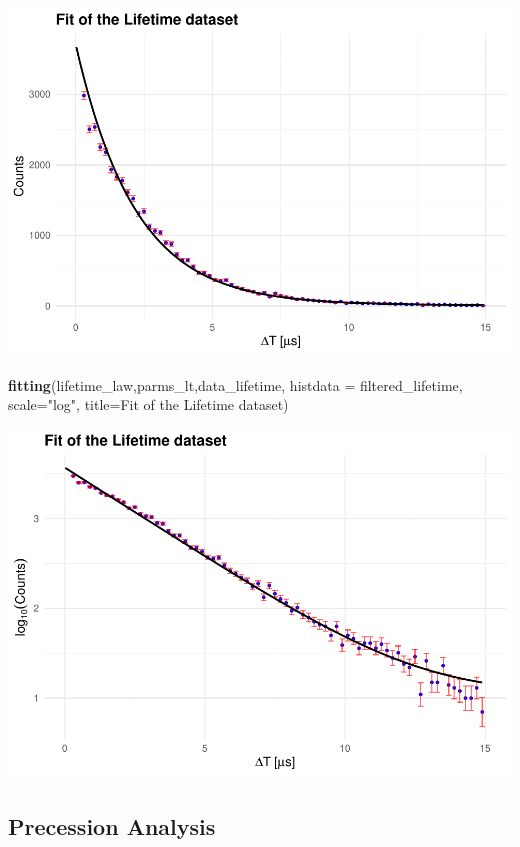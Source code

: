 \documentclass[
]{article}
\newenvironment{Shaded}{\begin{snugshade}}{\end{snugshade}}
\newcommand{\AttributeTok}[1]{\textcolor[rgb]{0.13,0.29,0.53}{#1}}
\newcommand{\FunctionTok}[1]{\textcolor[rgb]{0.13,0.29,0.53}{\textbf{#1}}}
\newcommand{\NormalTok}[1]{#1}
\newcommand{\StringTok}[1]{\textcolor[rgb]{0.31,0.60,0.02}{#1}}
\begin{document}
\includegraphics{BinnedAnalysis_files/figure-latex/unnamed-chunk-7-1.pdf}

\begin{Shaded}
\begin{Highlighting}[]
\FunctionTok{fitting}\NormalTok{(lifetime\_law,parms\_lt,data\_lifetime, }\AttributeTok{histdata =}\NormalTok{ filtered\_lifetime, }\AttributeTok{scale=}\StringTok{"log"}\NormalTok{, }\AttributeTok{title=}\StringTok{\textquotesingle{}Fit of the Lifetime dataset\textquotesingle{}}\NormalTok{)}
\end{Highlighting}
\end{Shaded}

\includegraphics{BinnedAnalysis_files/figure-latex/unnamed-chunk-7-2.pdf}

\subsection{Precession Analysis}\label{precession-analysis}
\end{document}
